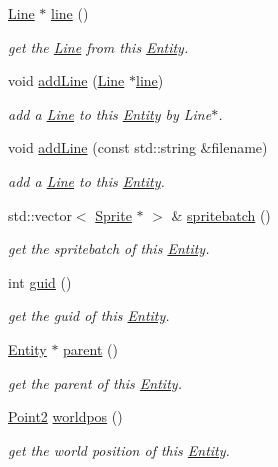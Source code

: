 \begin{DoxyCompactItemize}
\hyperlink{class_line}{Line} $\ast$ \hyperlink{class_entity_a81cacd62804c930558bc2ff3f0c927ae}{line} ()
\begin{DoxyCompactList}\small\item\em get the \hyperlink{class_line}{Line} from this \hyperlink{class_entity}{Entity}. \end{DoxyCompactList}\item 
void \hyperlink{class_entity_a9acaf95e1437e0d8c068e3468846fefa}{add\+Line} (\hyperlink{class_line}{Line} $\ast$\hyperlink{class_entity_a81cacd62804c930558bc2ff3f0c927ae}{line})
\begin{DoxyCompactList}\small\item\em add a \hyperlink{class_line}{Line} to this \hyperlink{class_entity}{Entity} by Line$\ast$. \end{DoxyCompactList}\item 
void \hyperlink{class_entity_a9383f0d8ce804b216fc6e8164b4466a5}{add\+Line} (const std\+::string \&filename)
\begin{DoxyCompactList}\small\item\em add a \hyperlink{class_line}{Line} to this \hyperlink{class_entity}{Entity}. \end{DoxyCompactList}\item 
std\+::vector$<$ \hyperlink{class_sprite}{Sprite} $\ast$ $>$ \& \hyperlink{class_entity_a103d3fc8fff63075df60502c1966a7bc}{spritebatch} ()
\begin{DoxyCompactList}\small\item\em get the spritebatch of this \hyperlink{class_entity}{Entity}. \end{DoxyCompactList}\item 
int \hyperlink{class_entity_ad4f911b665f003d191c2940d325da6d8}{guid} ()
\begin{DoxyCompactList}\small\item\em get the guid of this \hyperlink{class_entity}{Entity}. \end{DoxyCompactList}\item 
\hyperlink{class_entity}{Entity} $\ast$ \hyperlink{class_entity_a9e2f02efca39cd7c4eca36e662372c25}{parent} ()
\begin{DoxyCompactList}\small\item\em get the parent of this \hyperlink{class_entity}{Entity}. \end{DoxyCompactList}\item 
\hyperlink{pointx_8h_aca903a92c8ced8823fea9fac7e23677a}{Point2} \hyperlink{class_entity_a85ae0243e89910d56dd7140c8f735f41}{worldpos} ()
\begin{DoxyCompactList}\small\item\em get the world position of this \hyperlink{class_entity}{Entity}. \end{DoxyCompactList}\end{DoxyCompactItemize}
